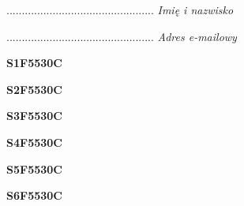\begin{turn}{90}\begin{minipage}{\linewidth} \vspace{20mm} ................................................  \textit{Imię i nazwisko}\end{minipage}\end{turn}

\begin{turn}{90}\begin{minipage}{\linewidth} \vspace{20mm} ................................................  \textit{Adres e-mailowy}\end{minipage}\end{turn}

\begin{turn}{90}\huge \begin{minipage}{\linewidth} \vspace{10mm}\textbf{S1F5530C}\end{minipage}\end{turn}

\begin{turn}{90}\huge \begin{minipage}{\linewidth} \vspace{10mm}\textbf{S2F5530C}\end{minipage}\end{turn}

\begin{turn}{90}\huge \begin{minipage}{\linewidth} \vspace{10mm}\textbf{S3F5530C}\end{minipage}\end{turn}

\begin{turn}{90}\huge \begin{minipage}{\linewidth} \vspace{10mm}\textbf{S4F5530C}\end{minipage}\end{turn}

\begin{turn}{90}\huge \begin{minipage}{\linewidth} \vspace{10mm}\textbf{S5F5530C}\end{minipage}\end{turn}

\begin{turn}{90}\huge \begin{minipage}{\linewidth} \vspace{10mm}\textbf{S6F5530C}\end{minipage}\end{turn}

